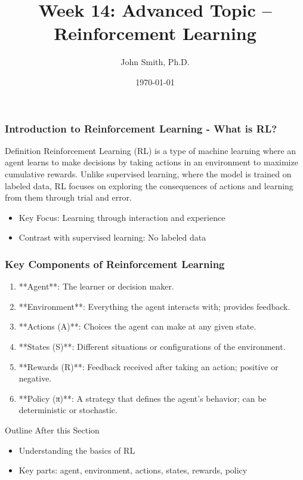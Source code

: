 \documentclass[aspectratio=169]{beamer}
\title[Reinforcement Learning]{Week 14: Advanced Topic – Reinforcement Learning}
\author[J. Smith]{John Smith, Ph.D.}
\institute[University Name]{
  Department of Computer Science\\
  University Name\\
  \vspace{0.3cm}
  Email: email@university.edu\\
  Website: www.university.edu
}
\date{\today}
\begin{document}
\frame{\titlepage}

\begin{frame}[fragile]
    \titlepage
\end{frame}

\begin{frame}[fragile]
    \frametitle{Introduction to Reinforcement Learning - What is RL?}
    
    \begin{block}{Definition}
        Reinforcement Learning (RL) is a type of machine learning where an agent learns to make decisions by taking actions in an environment to maximize cumulative rewards. Unlike supervised learning, where the model is trained on labeled data, RL focuses on exploring the consequences of actions and learning from them through trial and error.
    \end{block}
    
    \begin{itemize}
        \item Key Focus: Learning through interaction and experience
        \item Contrast with supervised learning: No labeled data
    \end{itemize}
\end{frame}

\begin{frame}[fragile]
    \frametitle{Key Components of Reinforcement Learning}
    
    \begin{enumerate}
        \item **Agent**: The learner or decision maker.
        \item **Environment**: Everything the agent interacts with; provides feedback.
        \item **Actions (A)**: Choices the agent can make at any given state.
        \item **States (S)**: Different situations or configurations of the environment.
        \item **Rewards (R)**: Feedback received after taking an action; positive or negative.
        \item **Policy (π)**: A strategy that defines the agent’s behavior; can be deterministic or stochastic.
    \end{enumerate}
    
    \begin{block}{Outline After this Section}
        \begin{itemize}
            \item Understanding the basics of RL
            \item Key parts: agent, environment, actions, states, rewards, policy
        \end{itemize}
    \end{block}
\end{frame}
\end{document}
